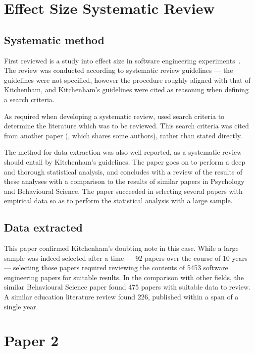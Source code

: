 \section{Effect Size Systematic Review}
\subsection{Systematic method}
First reviewed is a study into effect size in software engineering experiments~\citep{Kampenes2007}. The review was conducted according to systematic review guidelines --- the guidelines were not specified, however the procedure roughly aligned with that of Kitchenham, and Kitchenham's guidelines were cited as reasoning when defining a search criteria.\par

As required when developing a systematic review, \citep{Kampenes2007} used search criteria to determine the literature which was to be reviewed. This search criteria was cited from another paper (\citep{Sjoberg2005}, which shares some authors), rather than stated directly. \par

The method for data extraction was also well reported, as a systematic review should entail by Kitchenham's guidelines. The paper goes on to perform a deep and thorough statistical analysis, and concludes with a review of the results of these analyses with a comparison to the results of similar papers in Psychology and Behavioural Science. The paper succeeded in selecting several papers with empirical data so as to perform the statistical analysis with a large sample.\par

\subsection{Data extracted}
This paper confirmed Kitchenham's doubting note in this case. While a large sample was indeed selected after a time --- 92 papers over the course of 10 years --- selecting those papers required reviewing the contents of 5453 software engineering papers for suitable results. In the comparison with other fields, the similar Behavioural Science paper found 475 papers with suitable data to review. A similar education literature review found 226, published within a span of a single year.\par


\section{Paper 2}



